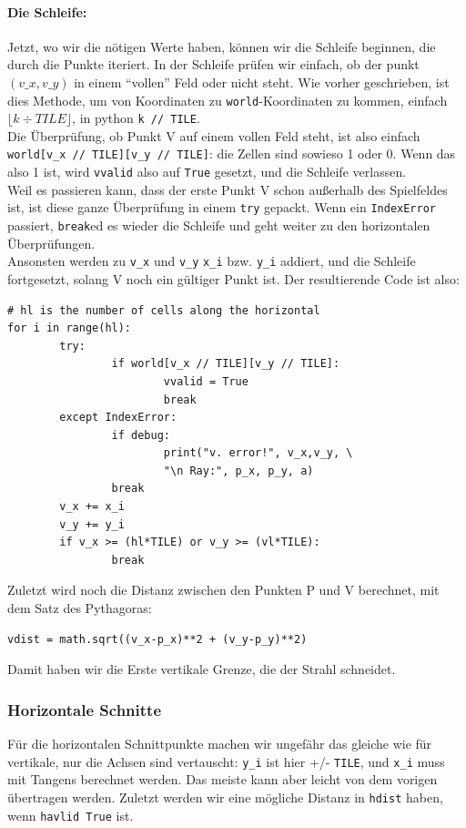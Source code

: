 \documentclass[a4paper,12pt]{report}
\begin{document}
\paragraph{Die Schleife:}
Jetzt, wo wir die nötigen Werte haben, können wir die Schleife beginnen, die durch die Punkte iteriert. In der Schleife prüfen wir einfach, ob der punkt $(v\_x,v\_y)$ in einem ``vollen'' Feld oder nicht steht. Wie vorher geschrieben, ist dies Methode, um von Koordinaten zu \texttt{world}-Koordinaten zu kommen, einfach $\lfloor k \div TILE \rfloor$, in python \texttt{k // TILE}. \\
Die Überprüfung, ob Punkt V auf einem vollen Feld steht, ist also einfach \texttt{world[v\_x // TILE][v\_y // TILE]}: die Zellen sind sowieso 1 oder 0. Wenn das also 1 ist, wird \texttt{vvalid} also auf \texttt{True} gesetzt, und die Schleife verlassen. \\
Weil es passieren kann, dass der erste Punkt V schon außerhalb des Spielfeldes ist, ist diese ganze Überprüfung in einem \texttt{try} gepackt. Wenn ein \texttt{IndexError} passiert, \texttt{break}ed es wieder die Schleife und geht weiter zu den horizontalen Überprüfungen. \\
Ansonsten werden zu \texttt{v\_x} und \texttt{v\_y} \texttt{x\_i} bzw. \texttt{y\_i} addiert, und die Schleife fortgesetzt, solang V noch ein gültiger Punkt ist. Der resultierende Code ist also:
\begin{Verbatim}[baselinestretch=1.0, xleftmargin=1cm]
# hl is the number of cells along the horizontal
for i in range(hl):
        try:
                if world[v_x // TILE][v_y // TILE]:
                        vvalid = True
                        break
        except IndexError:
                if debug:
                        print("v. error!", v_x,v_y, \
                        "\n Ray:", p_x, p_y, a)
                break
        v_x += x_i
        v_y += y_i
        if v_x >= (hl*TILE) or v_y >= (vl*TILE):
                break
\end{Verbatim}

Zuletzt wird noch die Distanz zwischen den Punkten P und V berechnet, mit dem Satz des Pythagoras:
\begin{Verbatim}[baselinestretch=1.0, xleftmargin=1cm]
vdist = math.sqrt((v_x-p_x)**2 + (v_y-p_y)**2)
\end{Verbatim}
Damit haben wir die Erste vertikale Grenze, die der Strahl schneidet.

\subsubsection{Horizontale Schnitte}
Für die horizontalen Schnittpunkte machen wir ungefähr das gleiche wie für vertikale, nur die Achsen sind vertauscht: \texttt{y\_i} ist hier +/- \texttt{TILE}, und \texttt{x\_i} muss mit Tangens berechnet werden. Das meiste kann aber leicht von dem vorigen übertragen werden. Zuletzt werden wir eine mögliche Distanz in \texttt{hdist} haben, wenn \texttt{havlid True} ist.
\end{document}
